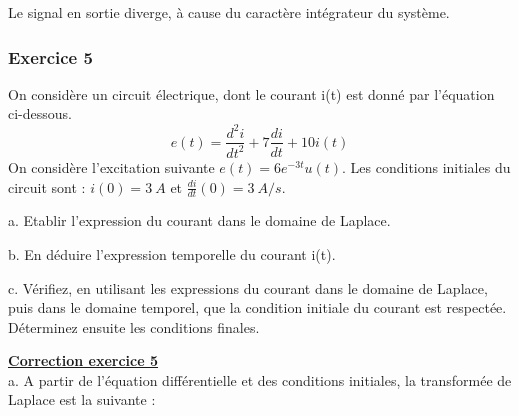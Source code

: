 \documentclass[11pt]{report}
\begin{document}
	Le signal en sortie diverge, à cause du caractère intégrateur du système.
	
	
	\vspace{1\baselineskip}
	
		
	\subsubsection{Exercice 5}
	
	On considère un circuit électrique, dont le courant i(t) est donné par l'équation ci-dessous.
	\begin{equation*}
		e(t)=\frac{d^{2}i}{dt^{2}}+7\frac{di}{dt}+10i(t)
	\end{equation*}
	On considère l'excitation suivante $e(t)=6e^{-3t}u(t)$. Les conditions initiales du circuit sont : $i(0) = 3~A$ et $\frac{di}{dt}(0)=3~A/s$.
	
	
	a. Etablir l'expression du courant dans le domaine de Laplace.
	
	b. En déduire l'expression temporelle du courant i(t).
	
	c. Vérifiez, en utilisant les expressions du courant dans le domaine de Laplace, puis dans le domaine temporel, que la condition initiale du courant est respectée. Déterminez ensuite les conditions finales.
	
	\vspace{1\baselineskip}
	
	\textbf{\underline{Correction exercice 5}}\\
	a. A partir de l'équation différentielle et des conditions initiales, la transformée de Laplace est la suivante :
	
\end{document}
